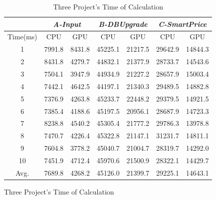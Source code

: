 \begin{figure}[!ht]
\begin{table}
  \centering
  \caption{Three Project's Time of Calculation}
  \label{tab:consuming}
  \begin{tabular}{ccc|cc|cc}
    \hline
    & \multicolumn{2}{c}{ \emph{A-Input} } & \multicolumn{2}{c}{ \emph{B-DBUpgrade} } & \multicolumn{2}{c}{ \emph{C-SmartPrice} } \\
    \hline
      Time(ms) & \hspace{.25cm} CPU \hspace{.25cm} & \hspace{.25cm} GPU \hspace{.25cm} & \hspace{.25cm} CPU \hspace{.25cm} & \hspace{.25cm} GPU \hspace{.25cm} & \hspace{.25cm} CPU \hspace{.25cm} & \hspace{.25cm} GPU \hspace{.25cm}\\
    \hline
     1 & 7991.8 & 8431.8 & 45225.1 & 21217.5 & 29642.9 & 14844.3 \\
     2 & 8431.8 & 4279.7 & 44832.1 & 21377.9 & 28733.7 & 14543.6 \\
     3 & 7504.1 & 3947.9 & 44934.9 & 21227.2 & 28657.9 & 15003.4 \\
     4 & 7442.1 & 4642.5 & 44197.1 & 21340.3 & 29489.5 & 14882.8 \\
     5 & 7376.9 & 4263.8 & 45233.7 & 22448.2 & 29379.5 & 14921.5 \\
     6 & 7385.4 & 4188.6 & 45197.5 & 20956.1 & 28687.9 & 14723.3 \\
     7 & 8238.8 & 4540.2 & 45305.4 & 21777.2 & 29786.3 & 13978.8 \\
     8 & 7470.7 & 4226.4 & 45322.8 & 21147.1 & 31231.7 & 14811.1 \\
     9 & 7604.8 & 3778.2 & 45040.7 & 21004.7 & 28319.7 & 14292.0 \\
     10  & 7451.9 & 4712.4 & 45970.6 & 21500.9 & 28322.1 & 14429.7 \\
     Avg. & 7689.8 & 4268.2 & 45126.0 & 21399.7 & 29225.1 & 14643.1 \\
    \hline
  \end{tabular}
\end{table}



\end{figure}
